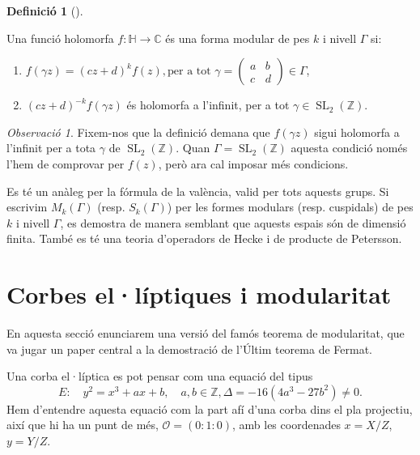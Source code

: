 \documentclass[
  letterpaper,
  DIV=11,
  numbers=noendperiod]{scrreprt}
\providecommand{\tightlist}{%
  \setlength{\itemsep}{0pt}\setlength{\parskip}{0pt}}\usepackage{longtable,booktabs,array}
\theoremstyle{plain}
\theoremstyle{plain}
\theoremstyle{definition}
\newtheorem{definition}{Definició}[chapter]
\theoremstyle{plain}
\theoremstyle{plain}
\theoremstyle{definition}
\theoremstyle{remark}
\newtheorem{refremark}{Observació}[chapter]
\begin{document}
\begin{definition}[]\protect\hypertarget{def-forma-modular}{}\label{def-forma-modular}

Una funció holomorfa \(f\colon \mathbb{H}\longrightarrow\mathbb{C}\) és
una forma modular de pes \(k\) i nivell \(\Gamma\) si:

\begin{enumerate}
\def\labelenumi{\arabic{enumi}.}
\tightlist
\item
  \(f(\gamma z) = (cz+d)^k f(z), \text{per a tot }\gamma=\left(\begin{smallmatrix}a&b\\c&d\end{smallmatrix}\right) \in \Gamma\),
\item
  \((cz+d)^{-k}f(\gamma z)\) és holomorfa a l'infinit, per a tot
  \(\gamma\in \operatorname{SL}_2(\mathbb{Z})\).
\end{enumerate}

\end{definition}

\begin{refremark}
Fixem-nos que la definició demana que \(f(\gamma z)\) sigui holomorfa a
l'infinit per a tota \(\gamma\) de \(\operatorname{SL}_2(\mathbb{Z})\).
Quan \(\Gamma=\operatorname{SL}_2(\mathbb{Z})\) aquesta condició només
l'hem de comprovar per \(f(z)\), però ara cal imposar més condicions.

\label{rem-}

\end{refremark}

Es té un anàleg per la fórmula de la valència, valid per tots aquests
grups. Si escrivim \(M_k(\Gamma)\) (resp. \(S_k(\Gamma)\)) per les
formes modulars (resp. cuspidals) de pes \(k\) i nivell \(\Gamma\), es
demostra de manera semblant que aquests espais són de dimensió finita.
També es té una teoria d'operadors de Hecke i de producte de Petersson.

\section{Corbes el·líptiques i
modularitat}\label{corbes-elluxedptiques-i-modularitat}

En aquesta secció enunciarem una versió del famós teorema de
modularitat, que va jugar un paper central a la demostració de l'Últim
teorema de Fermat.

Una corba el·líptica es pot pensar com una equació del tipus \[
E\colon\quad y^2=x^3+ax+b,\quad a,b\in\mathbb{Z}, \Delta=-16(4a^3-27b^2)\neq 0.
\] Hem d'entendre aquesta equació com la part afí d'una corba dins el
pla projectiu, així que hi ha un punt de més, \(\mathcal{O}=(0:1:0)\),
amb les coordenades \(x=X/Z\), \(y=Y/Z\).
\end{document}
